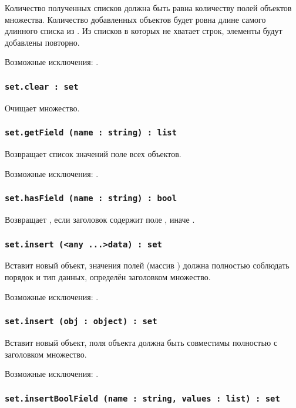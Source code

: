 Количество полученных списков должна быть равна количеству полей объектов множества. Количество добавленных объектов будет ровна длине самого длинного списка из . Из списков в которых не хватает строк, элементы будут добавлены повторно.

Возможные исключения: .

\subsubsection{\lstinline|set.clear : set|}

Очищает множество.

\subsubsection{\lstinline|set.getField (name : string) : list|}

Возвращает список значений поле  всех объектов.

Возможные исключения: .

\subsubsection{\lstinline|set.hasField (name : string) : bool|}

Возвращает \true, если заголовок содержит поле , иначе \false.

\subsubsection{\lstinline|set.insert (<any ...>data) : set|}

Вставит новый объект, значения полей (массив ) должна полностью соблюдать порядок и тип данных, определён заголовком множество.

Возможные исключения: .

\subsubsection{\lstinline|set.insert (obj : object) : set|}

Вставит новый объект, поля объекта  должна быть совместимы полностью с заголовком множество.

Возможные исключения: .

\subsubsection{\lstinline|set.insertBoolField (name : string, values : list) : set|}

